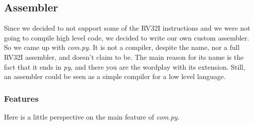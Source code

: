 \subsection{Assembler}
\label{sec:assembler}
Since we decided to not support some of the RV32I instructions and we were not going to compile high level code, we decided to write our own custom assembler. So we came up with \textit{com.py}. It is not a compiler, despite the name, nor a full RV32I assembler, and doesn't claim to be. The main reason for its name is the fact that it ends in \textit{py}, and there you are the wordplay with its extension. Still, an assembler could be seen as a simple compiler for a low level language. 

\subsubsection{Features}
Here is a little perspective on the main feature of \textit{com.py}.
